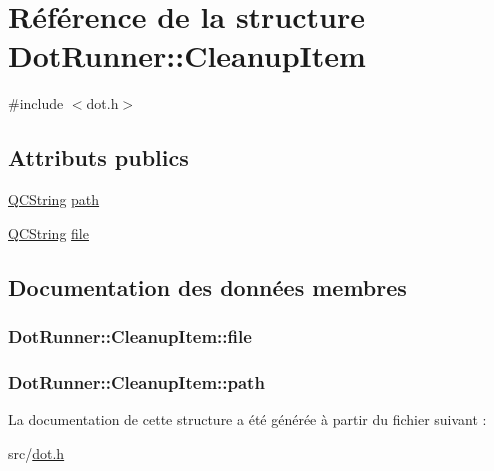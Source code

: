 \hypertarget{struct_dot_runner_1_1_cleanup_item}{}\section{Référence de la structure Dot\+Runner\+:\+:Cleanup\+Item}
\label{struct_dot_runner_1_1_cleanup_item}


{\ttfamily \#include $<$dot.\+h$>$}

\subsection*{Attributs publics}
\begin{DoxyCompactItemize}
\item 
\hyperlink{class_q_c_string}{Q\+C\+String} \hyperlink{struct_dot_runner_1_1_cleanup_item_afda3592327ac3fda108e1b5d8c418576}{path}
\item 
\hyperlink{class_q_c_string}{Q\+C\+String} \hyperlink{struct_dot_runner_1_1_cleanup_item_aab4689cf5c95fa065488f9678009dffa}{file}
\end{DoxyCompactItemize}


\subsection{Documentation des données membres}
\hypertarget{struct_dot_runner_1_1_cleanup_item_aab4689cf5c95fa065488f9678009dffa}{}
\subsubsection[{file}]{ Dot\+Runner\+::\+Cleanup\+Item\+::file}\label{struct_dot_runner_1_1_cleanup_item_aab4689cf5c95fa065488f9678009dffa}
\hypertarget{struct_dot_runner_1_1_cleanup_item_afda3592327ac3fda108e1b5d8c418576}{}
\subsubsection[{path}]{ Dot\+Runner\+::\+Cleanup\+Item\+::path}\label{struct_dot_runner_1_1_cleanup_item_afda3592327ac3fda108e1b5d8c418576}


La documentation de cette structure a été générée à partir du fichier suivant \+:\begin{DoxyCompactItemize}
\item 
src/\hyperlink{dot_8h}{dot.\+h}\end{DoxyCompactItemize}
